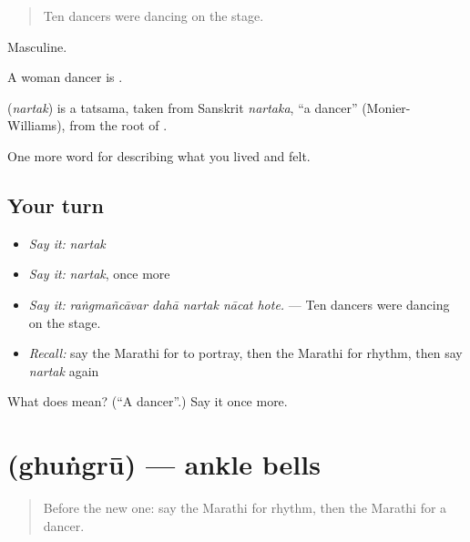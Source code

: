 \begin{quote}
Ten dancers were dancing on the stage.
\end{quote}

Masculine.

A woman dancer is .

\begin{cousinweb}
\textbf{} (\emph{nartak}) is a tatsama, taken from Sanskrit \emph{nartaka}, \textquotedblleft{}a dancer\textquotedblright{} (Monier-Williams), from the root of .
\end{cousinweb}

\begin{grammarlens}[title={What you've built}]
One more word for describing what you lived and felt.
\end{grammarlens}

\subsection*{Your turn}
\begin{itemize}
\raggedright
  \item \emph{Say it:} \emph{nartak}
  \item \emph{Say it:} \emph{nartak}, once more
  \item \emph{Say it:} \emph{raṅgmañcāvar dahā nartak nācat hote.} — Ten dancers were dancing on the stage.
  \item \emph{Recall:} say the Marathi for to portray, then the Marathi for rhythm, then say \emph{nartak} again
\end{itemize}

\begin{tcolorbox}[breakable,colback=teal!4,colframe=teal!35!black,title={Before you move on}]
What does  mean? (\textquotedblleft{}A dancer\textquotedblright{}.) Say it once more.
\end{tcolorbox}
\section[\texorpdfstring{\mr{घुंगरू} (ghuṅgrū)}{घुंगरू (ghuṅgrū)}]{ (ghuṅgrū) — ankle bells}

\label{lesson:MR-C538-ghungru}



\begin{quote}
Before the new one: say the Marathi for rhythm, then the Marathi for a dancer.
\end{quote}

